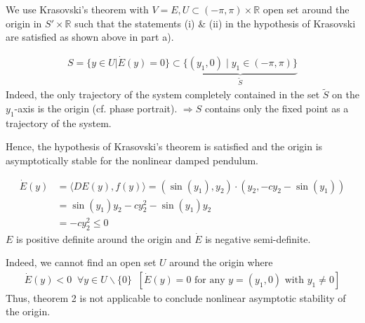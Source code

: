 \begin{solution}[3.6]
We use Krasovski's theorem with $V = E, U \subset (-\pi, \pi) \times \mathbb{R}$ open set around the origin in $S' \times \mathbb{R}$ such that the statements (i) \& (ii) in the hypothesis of Krasovski are satisfied as shown above in part a).

\begin{align}
	S = \{ y \in U \vert \dot{E}(y)=0 \} \subset \underbrace{\{ (y_1, 0) \;\vert\; y_1 \in (-\pi,\pi) \}}_{\tilde{S}}
\end{align}
Indeed, the only trajectory of the system completely contained in the set $\tilde{S}$ on the $y_1$-axis is the origin (cf. phase portrait). $\Longrightarrow S$ contains only the fixed point as a trajectory of the system.

Hence, the hypothesis of Krasovski's theorem is satisfied and the origin is asymptotically stable for the nonlinear damped pendulum.
\end{solution}

\begin{solution}[3.7]
\begin{align}
	\dot{E}(y) &= \langle DE(y),f(y) \rangle = (\sin(y_1),y_2) \cdot (y_2, -cy_2 - \sin(y_1)) \\
	&= \sin(y_1)y_2 - cy_2^2 -\sin(y_1)y_2 \\
	&= -cy_2^2 \leq 0
\end{align}
$E$ is positive definite around the origin and $\dot{E}$ is negative semi-definite.

Indeed, we cannot find an open set $U$ around the origin where
\begin{align}
	\dot{E}(y)<0 \;\; \forall y \in U\backslash \{0\} \;\; [\dot{E}(y)=0 \text{ for any } y = (y_1,0) \text{ with } y_1 \neq 0]
\end{align}
Thus, theorem 2 is not applicable to conclude nonlinear asymptotic stability of the origin.
\end{solution}

